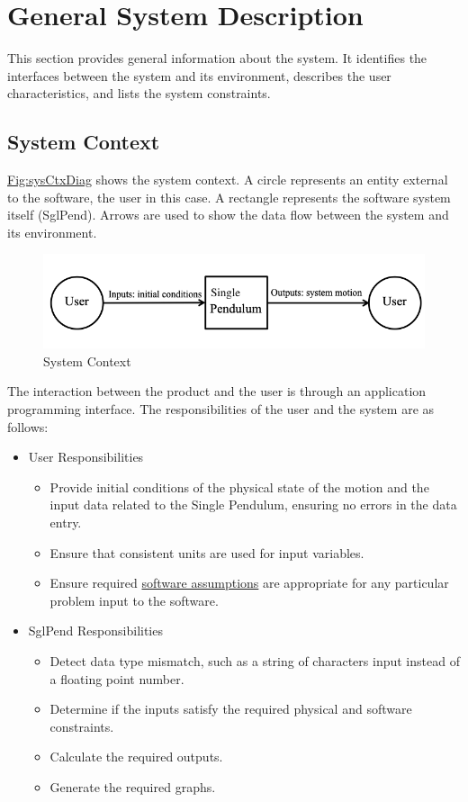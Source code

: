\documentclass[12pt]{article}
\begin{document}
\section{General System Description}
\label{Sec:GenSysDesc}
This section provides general information about the system. It identifies the interfaces between the system and its environment, describes the user characteristics, and lists the system constraints.

\subsection{System Context}
\label{Sec:SysContext}
\hyperref[Figure:sysCtxDiag]{Fig:sysCtxDiag} shows the system context. A circle represents an entity external to the software, the user in this case. A rectangle represents the software system itself (SglPend). Arrows are used to show the data flow between the system and its environment.

\begin{figure}[H]
\begin{center}
\includegraphics[width=\textwidth]{../../../../datafiles/sglpend/SystemContextFigure.png}
\caption{System Context}
\label{Figure:sysCtxDiag}
\end{center}
\end{figure}
The interaction between the product and the user is through an application programming interface. The responsibilities of the user and the system are as follows:

\begin{itemize}
\item{User Responsibilities}
\begin{itemize}
\item{Provide initial conditions of the physical state of the motion and the input data related to the Single Pendulum, ensuring no errors in the data entry.}
\item{Ensure that consistent units are used for input variables.}
\item{Ensure required \hyperref[Sec:Assumps]{software assumptions} are appropriate for any particular problem input to the software.}
\end{itemize}
\item{SglPend Responsibilities}
\begin{itemize}
\item{Detect data type mismatch, such as a string of characters input instead of a floating point number.}
\item{Determine if the inputs satisfy the required physical and software constraints.}
\item{Calculate the required outputs.}
\item{Generate the required graphs.}
\end{itemize}
\end{itemize}
\end{document}
